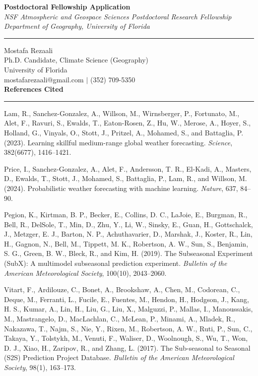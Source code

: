 \documentclass[11pt,letterpaper]{article}
\begin{document}
\begin{center}
    \vspace*{-1.5cm}
    {\Large\bfseries Postdoctoral Fellowship Application} \\[0.2cm]
    {\small\textit{NSF Atmospheric and Geospace Sciences Postdoctoral Research Fellowship}} \\[0.05cm]
    {\small\textit{Department of Geography, University of Florida}} \\[0.1cm]
    \rule{0.6\textwidth}{0.4pt}
\end{center}
\vspace{-0.5cm}

\noindent
Mostafa Rezaali \\
Ph.D. Candidate, Climate Science (Geography) \\
University of Florida \\
mostafarezaali@gmail.com \quad $\mid$ \quad (352) 709-5350 \\[0.3cm]
{\large\bfseries References Cited}\\[-0.15cm]
\rule{\textwidth}{0.4pt}

\noindent Lam, R., Sanchez-Gonzalez, A., Willson, M., Wirnsberger, P., Fortunato, M., Alet, F., Ravuri, S., Ewalds, T., Eaton-Rosen, Z., Hu, W., Merose, A., Hoyer, S., Holland, G., Vinyals, O., Stott, J., Pritzel, A., Mohamed, S., and Battaglia, P. (2023). Learning skillful medium-range global weather forecasting. \textit{Science}, 382(6677), 1416--1421.

\noindent Price, I., Sanchez-Gonzalez, A., Alet, F., Andersson, T. R., El-Kadi, A., Masters, D., Ewalds, T., Stott, J., Mohamed, S., Battaglia, P., Lam, R., and Willson, M. (2024). Probabilistic weather forecasting with machine learning. \textit{Nature}, 637, 84--90.

\noindent Pegion, K., Kirtman, B. P., Becker, E., Collins, D. C., LaJoie, E., Burgman, R., Bell, R., DelSole, T., Min, D., Zhu, Y., Li, W., Sinsky, E., Guan, H., Gottschalck, J., Metzger, E. J., Barton, N. P., Achuthavarier, D., Marshak, J., Koster, R., Lin, H., Gagnon, N., Bell, M., Tippett, M. K., Robertson, A. W., Sun, S., Benjamin, S. G., Green, B. W., Bleck, R., and Kim, H. (2019). The Subseasonal Experiment (SubX): A multimodel subseasonal prediction experiment. \textit{Bulletin of the American Meteorological Society}, 100(10), 2043--2060.

\noindent Vitart, F., Ardilouze, C., Bonet, A., Brookshaw, A., Chen, M., Codorean, C., Deque, M., Ferranti, L., Fucile, E., Fuentes, M., Hendon, H., Hodgson, J., Kang, H. S., Kumar, A., Lin, H., Liu, G., Liu, X., Malguzzi, P., Mallas, I., Manoussakis, M., Mastrangelo, D., MacLachlan, C., McLean, P., Minami, A., Mladek, R., Nakazawa, T., Najm, S., Nie, Y., Rixen, M., Robertson, A. W., Ruti, P., Sun, C., Takaya, Y., Tolstykh, M., Venuti, F., Waliser, D., Woolnough, S., Wu, T., Won, D. J., Xiao, H., Zaripov, R., and Zhang, L. (2017). The Sub-seasonal to Seasonal (S2S) Prediction Project Database. \textit{Bulletin of the American Meteorological Society}, 98(1), 163--173.
\end{document}
